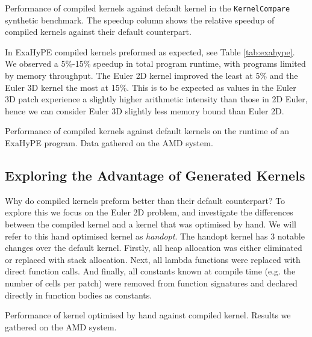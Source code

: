 \begin{table}
    \centering
 
\caption{Performance of compiled kernels against default kernel in the \texttt{KernelCompare} synthetic benchmark. The speedup column shows the relative speedup of compiled kernels against their default counterpart.}\label{tab:kernel_comapre} 
\end{table}

In ExaHyPE compiled kernels preformed as expected, see Table \ref{tab:exahype}.
We observed a 5\%-15\% speedup in total program runtime, with programs limited by memory throughput.
The Euler 2D kernel improved the least at 5\% and the Euler 3D kernel the most at 15\%.
This is to be expected as values in the Euler 3D patch experience a slightly higher arithmetic intensity than those in 2D Euler, hence we can consider Euler 3D slightly less memory bound than Euler 2D.
 
\begin{table}
    \centering
 
\caption{Performance of compiled kernels against default kernels on the runtime of an ExaHyPE program. Data gathered on the AMD system.}\label{tab:exahype} 
\end{table}

\subsection{Exploring the Advantage of Generated Kernels}

Why do compiled kernels preform better than their default counterpart?
To explore this we focus on the Euler 2D problem, and investigate the differences between the compiled kernel and a kernel that was optimised by hand.
We will refer to this hand optimised kernel as \textit{handopt}.
The handopt kernel has 3 notable changes over the default kernel.
Firstly, all heap allocation was either eliminated or replaced with stack allocation.
Next, all lambda functions were replaced with direct function calls.
And finally, all constants known at compile time (e.g. the number of cells per patch) were removed from function signatures and declared directly in function bodies as constants.


\begin{table}
    \centering
     
    \caption{Performance of kernel optimised by hand against compiled kernel. Results we gathered on the AMD system.}\label{tab:hand_v_compiled}
\end{table}

